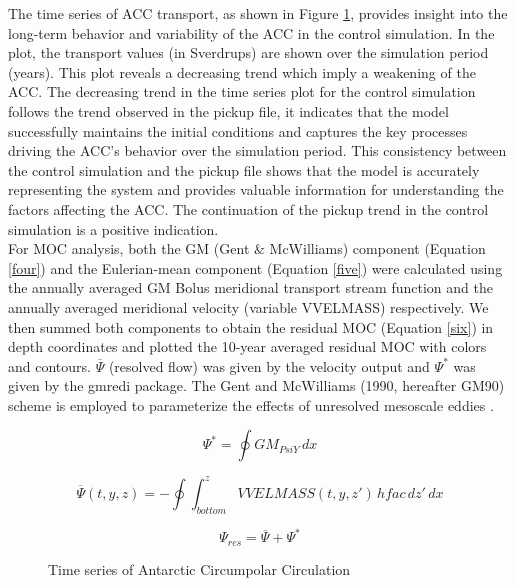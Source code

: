 \documentclass[12pt]{article}
\begin{document}
\noindent The time series of ACC transport, as shown in Figure \ref{fig:thirdplot}, provides insight into the long-term behavior and variability of the ACC in the control simulation. In the  plot, the transport values (in Sverdrups) are shown over the simulation period (years). This plot reveals a decreasing trend which imply a weakening of the ACC. The decreasing trend in the time series plot for the control simulation follows the trend observed in the pickup file, it indicates that the model successfully maintains the initial conditions and captures the key processes driving the ACC's behavior over the simulation period. This consistency between the control simulation and the pickup file shows that the model is accurately representing the system and provides valuable information for understanding the factors affecting the ACC. The continuation of the pickup trend in the control simulation is a positive indication.\\

\noindent For MOC analysis,  both the GM (Gent \& McWilliams) component (Equation \ref{four}) and the Eulerian-mean component (Equation \ref{five}) were calculated using the annually averaged GM Bolus meridional transport stream function  and the annually averaged meridional velocity (variable VVELMASS) respectively. We then summed both components to obtain the residual MOC (Equation \ref{six}) in depth coordinates and plotted the 10-year averaged residual MOC with colors and contours. $\overline{\Psi}$ (resolved flow)
was given by the velocity output and $\Psi^{*}$ was given by the gmredi package. The Gent and McWilliams (1990, hereafter GM90) scheme is employed to parameterize the effects of unresolved mesoscale eddies \citep{spence2010southern}.


\begin{equation}\label{four}
    \Psi^{*}=\oint\mathit{GM_{PsiY}}\,dx
\end{equation}

\begin{equation}\label{five}
\overline{\Psi}(t, y, z) = -\oint \int_{\mathit{bottom}}^{z} \mathit{VVELMASS}(t, y, z')\,\mathit{hfac}\,dz'\,dx
\end{equation}

\begin{equation}\label{six}
\Psi_{res} = \overline{\Psi}+\Psi^{*}
\end{equation}
\begin{figure}
    \begin{center}
    \caption{Time series of Antarctic Circumpolar Circulation}
    \label{fig:thirdplot}
    \end{center}
\end{figure}
\end{document}

